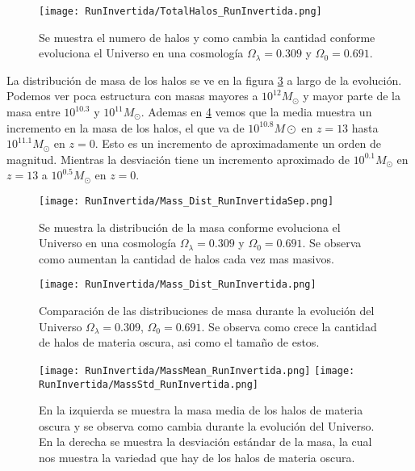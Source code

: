 \begin{figure}[H]
    \centering
    \texttt{[image: RunInvertida/TotalHalos\_RunInvertida.png]}
    \caption[Evolución del número de halos en un Universo $\Omega_\lambda = 0.309 $, $\Omega_0 = 0.691$]{\footnotesize Se muestra el numero de halos y como cambia la cantidad conforme evoluciona el Universo en una cosmología $\Omega_\lambda = 0.309 $ y $\Omega_0 = 0.691$.}    
    \label{fig:Invertida-TotalHalos}
\end{figure}

La distribución de masa de los halos se ve en la figura \ref{fig:Invertida-MassDist} a largo de la evolución. Podemos ver poca estructura con masas mayores a $10^{12}M_\odot$ y mayor parte de la masa entre $10^{10.3}$ y $10^{11}M_\odot$. Ademas en  \ref{fig:Invertida-MassStats} vemos que la media muestra un incremento en la masa de los halos, el que va de $10^{10.8} M\odot$ en $z=13$ hasta $10^{11.1}M_\odot$ en $z=0$. Esto es un incremento de aproximadamente un orden de magnitud. Mientras la desviación tiene un incremento aproximado de $10^{0.1}M_\odot$ en $z=13$ a $10^{0.5}M_\odot$ en $z=0$. 

\begin{figure}[H]
    \centering
    \texttt{[image: RunInvertida/Mass\_Dist\_RunInvertidaSep.png]}
    \caption[Distribución de masa en la evolución de un Universo $\Omega_\lambda = 0.309 $, $\Omega_0 = 0.691$]{\footnotesize Se muestra la distribución de la masa conforme evoluciona el Universo en una cosmología $\Omega_\lambda = 0.309 $ y $\Omega_0 = 0.691$. Se observa como aumentan la cantidad de halos cada vez mas masivos.}
    \label{fig:Invertida-MassDistSep}
\end{figure}

\begin{figure}[H]
    \centering
    \texttt{[image: RunInvertida/Mass\_Dist\_RunInvertida.png]}
    \caption[Comparación de distribución de masa Universo $\Omega_\lambda = 0.309 $, $\Omega_0 = 0.691$]{\footnotesize Comparación de las distribuciones de masa durante la evolución del Universo $\Omega_\lambda = 0.309 $, $\Omega_0 = 0.691$. Se observa como crece la cantidad de halos de materia oscura, asi como el tamaño de estos.}
    \label{fig:Invertida-MassDist}
\end{figure}

\begin{figure}[H]
    \centering
    \texttt{[image: RunInvertida/MassMean\_RunInvertida.png]}
    \texttt{[image: RunInvertida/MassStd\_RunInvertida.png]}
    \caption[Media y desviación estándar de la distribución de masa de un Universo $\Omega_\lambda = 0.309 $, $\Omega_0 = 0.691$]{\footnotesize En la izquierda se muestra la masa media de los halos de materia oscura y se observa como cambia durante la evolución del Universo. En la derecha se muestra la desviación estándar de la masa, la cual nos muestra la variedad que hay de los halos de materia oscura.}
    \label{fig:Invertida-MassStats}
\end{figure}

